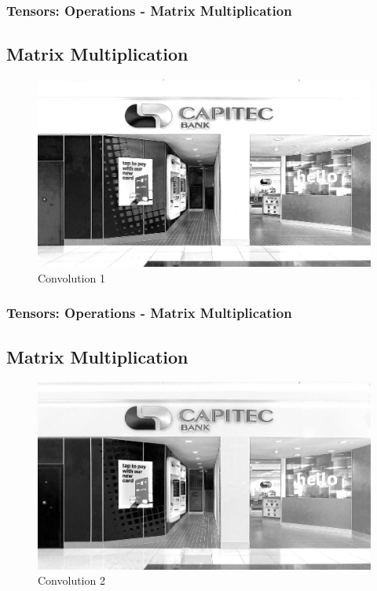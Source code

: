 \documentclass[11pt]{beamer}
\begin{document}
\begin{frame}
	\frametitle{Tensors: Operations - Matrix Multiplication}
	\subsection{Matrix Multiplication}
	\begin{figure}
		\includegraphics[scale=0.17]{"conv_1"}
		\caption{Convolution 1}
	\end{figure}
\end{frame}

\begin{frame}
	\frametitle{Tensors: Operations - Matrix Multiplication}
	\subsection{Matrix Multiplication}
	\begin{figure}
		\includegraphics[scale=0.17]{"conv_2"}
		\caption{Convolution 2}
	\end{figure}
\end{frame}
\end{document}
